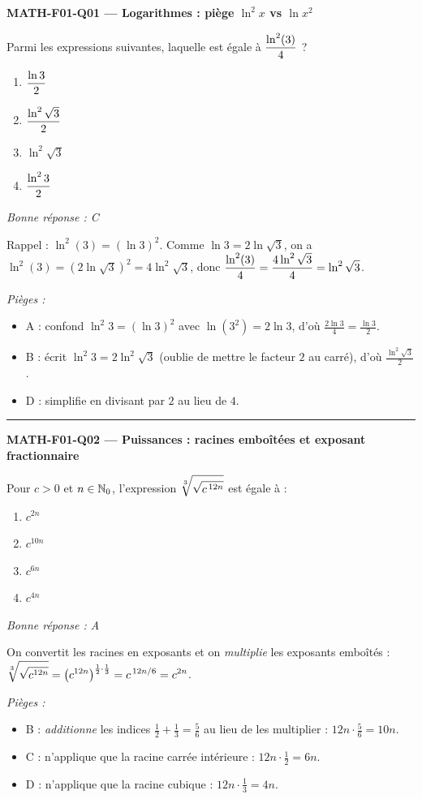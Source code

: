 \documentclass[11pt,a4paper]{article}
\begin{document}
\noindent\textbf{MATH-F01-Q01 --- Logarithmes : piège $\ln^2 x$ vs $\ln x^2$}\par
Parmi les expressions suivantes, laquelle est \'egale \`a $\displaystyle\frac{\ln^2(3)}{4}$ ?
\begin{enumerate}[label=\Alph*)]
\item $\displaystyle\frac{\ln 3}{2}$
\item $\displaystyle\frac{\ln^2\sqrt3}{2}$
\item $\ln^2\sqrt3$
\item $\displaystyle\frac{\ln^2 3}{2}$
\end{enumerate}
\textit{Bonne réponse : C}\par
Rappel : $\ln^2(3)=(\ln 3)^2$. Comme $\ln 3=2\ln\sqrt3$, on a $\ln^2(3)=(2\ln\sqrt3)^2=4\ln^2\sqrt3$, donc $\displaystyle\frac{\ln^2(3)}{4}=\frac{4\ln^2\sqrt3}{4}=\ln^2\sqrt3$.\par
\textit{Pièges :}
\begin{itemize}
\item A : confond $\ln^2 3=(\ln 3)^2$ avec $\ln(3^2)=2\ln 3$, d'o\`u $\frac{2\ln 3}{4}=\frac{\ln 3}{2}$.
\item B : \'ecrit $\ln^2 3=2\ln^2\sqrt3$ (oublie de mettre le facteur $2$ au carr\'e), d'o\`u $\frac{\ln^2\sqrt3}{2}$.
\item D : \guillemotleft{} simplifie \guillemotright{} en divisant par $2$ au lieu de $4$.
\end{itemize}
\vspace{8pt}\hrule\vspace{8pt}
\noindent\textbf{MATH-F01-Q02 --- Puissances : racines emboîtées et exposant fractionnaire}\par
Pour $c>0$ et $n\in\mathbb{N}_0$, l'expression $\displaystyle\sqrt[3]{\sqrt{c^{\,12n}}}$ est \'egale \`a :
\begin{enumerate}[label=\Alph*)]
\item $c^{2n}$
\item $c^{10n}$
\item $c^{6n}$
\item $c^{4n}$
\end{enumerate}
\textit{Bonne réponse : A}\par
On convertit les racines en exposants et on \emph{multiplie} les exposants emboîtés : $\displaystyle\sqrt[3]{\sqrt{c^{12n}}}=\left(c^{12n}\right)^{\frac12\cdot\frac13}=c^{\,12n/6}=c^{2n}$.\par
\textit{Pièges :}
\begin{itemize}
\item B : \emph{additionne} les indices $\frac12+\frac13=\frac56$ au lieu de les multiplier : $12n\cdot\frac56=10n$.
\item C : n'applique que la racine carr\'ee int\'erieure : $12n\cdot\frac12=6n$.
\item D : n'applique que la racine cubique : $12n\cdot\frac13=4n$.
\end{itemize}
\end{document}
